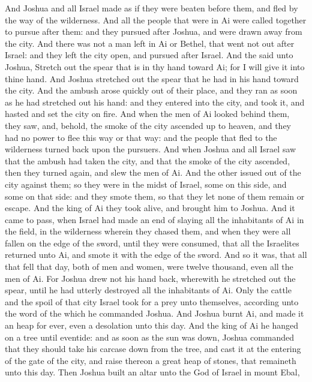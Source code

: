 \begin{biblechapter}
\verse And Joshua and all Israel made as if they were beaten before them, and fled by the way of the wilderness.
\verse And all the people that were in Ai were called together to pursue after them: and they pursued after Joshua, and were drawn away from the city.
\verse And there was not a man left in Ai or Bethel, that went not out after Israel: and they left the city open, and pursued after Israel.
\verse And the \LORD said unto Joshua, Stretch out the spear that is in thy hand toward Ai; for I will give it into thine hand. And Joshua stretched out the spear that he had in his hand toward the city.
\verse And the ambush arose quickly out of their place, and they ran as soon as he had stretched out his hand: and they entered into the city, and took it, and hasted and set the city on fire.
\verse And when the men of Ai looked behind them, they saw, and, behold, the smoke of the city ascended up to heaven, and they had no power to flee this way or that way: and the people that fled to the wilderness turned back upon the pursuers.
\verse And when Joshua and all Israel saw that the ambush had taken the city, and that the smoke of the city ascended, then they turned again, and slew the men of Ai.
\verse And the other issued out of the city against them; so they were in the midst of Israel, some on this side, and some on that side: and they smote them, so that they let none of them remain or escape.
\verse And the king of Ai they took alive, and brought him to Joshua.
\verse And it came to pass, when Israel had made an end of slaying all the inhabitants of Ai in the field, in the wilderness wherein they chased them, and when they were all fallen on the edge of the sword, until they were consumed, that all the Israelites returned unto Ai, and smote it with the edge of the sword.
\verse And so it was, that all that fell that day, both of men and women, were twelve thousand, even all the men of Ai.
\verse For Joshua drew not his hand back, wherewith he stretched out the spear, until he had utterly destroyed all the inhabitants of Ai.
\verse Only the cattle and the spoil of that city Israel took for a prey unto themselves, according unto the word of the \LORD which he commanded Joshua.
\verse And Joshua burnt Ai, and made it an heap for ever, even a desolation unto this day.
\verse And the king of Ai he hanged on a tree until eventide: and as soon as the sun was down, Joshua commanded that they should take his carcase down from the tree, and cast it at the entering of the gate of the city, and raise thereon a great heap of stones, that remaineth unto this day.
 Then Joshua built an altar unto the \LORD God of Israel in mount Ebal,

\end{biblechapter}
